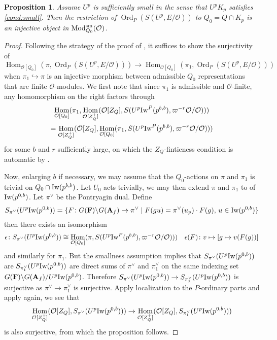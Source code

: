 \documentclass[leqno]{amsart}
\newcommand{\Iw}{\textnormal{Iw}}
\DeclareMathOperator{\Mod}{\textnormal{Mod}}
\DeclareMathOperator{\Ord}{Ord}
\newcommand{\sm}{\textnormal{sm}}
\newcommand{\A}{\mathbf A}
\newcommand{\F}{{\mathbf{F}}} %
\newcommand{\oo}{\mathcal{O}} %
\DeclareMathOperator{\Hom}{Hom}
\newtheorem{prop}[thm]{Proposition}
\theoremstyle{definition}
\theoremstyle{remark}
\begin{document}
\begin{prop}
	Assume  $U^p$ is sufficiently small in the sense
	that  $U^pK_p$ satisfies \eqref{cond:small}.
	Then the restriction of
	$\Ord_P(S(U^p,E/\oo))$ to $Q_0=Q\cap K_p$ 
	is an injective object
	in $\Mod^{\sm}_{Q_0}(\oo)$.
\end{prop}
\begin{proof}
	Following the strategy of the proof of 
	\cite[Prop 3.2.4]{pan}, 
	it suffices to show the surjectivity of
	\[
		\Hom_{\oo[Q_0]}(\pi,\Ord_P(S(U^p,E/\oo)))\to 
		\Hom_{\oo[Q_0]}(\pi_1,\Ord_P(S(U^p,E/\oo)))
	\]
	when $\pi_{1}\hookrightarrow \pi$ 
	is an injective morphism between admissible $Q_0$
	representations that are finite $\oo$-modules.
	We first note that since $\pi_1$ is admissible
	and $\oo$-finite,
	any homomorphism on the right factors 
	through 
	\begin{multline*}
		\Hom_{\oo[Q_0]}(\pi_1,
		\Hom_{\oo[Z_Q^+]}
		(\oo[Z_Q], S(U^p\Iw^P(p^{b,b}),
		\varpi^{-r}\oo/\oo)))\\=
		\Hom_{\oo[Z_Q^+]}(\oo[Z_Q],
		\Hom_{\oo[Q_0]}(\pi_1, 
		S(U^p\Iw^P(p^{b,b}),\varpi^{-r}\oo/\oo)))
	\end{multline*}
	for some $b$ and  $r$ sufficiently large,
	on which 
	the $Z_Q$-fintieness condition is automatic
	by \cite[Lem 3.1.5]{emeI}.

	Now, enlarging $b$ if necessary,
	we may assume that 
	the $Q_0$-actions on 
	$\pi$ and $\pi_1$ is trivial on
	$Q_0\cap \Iw(p^{b,b})$. 
	Let $U_0$ acts trivially,
	we may then extend $\pi$ and  $\pi_1$
	to of $\Iw(p^{0,b})$.
	Let $\pi^\vee$ be the Pontryagin dual.
	Define
	\[
		S_{\pi^\vee}(U^p\Iw(p^{0,b}))=
		\{
			F\colon G(\F)\backslash G(\A_f)\to 
			\pi^\vee\mid 
			F(gu)=\pi^\vee(u_p)\cdot F(g),\,
			u\in \Iw(p^{0,b})
		\}
	\]
	then there exists an isomorphism
	\[
		\epsilon\colon 
		S_{\pi^\vee}(U^p\Iw(p^{0,b}))\cong 
		\Hom_{\oo[Q_0]}(\pi,
		S(U^p\Iw^P(p^{b,b}),\varpi^{-r}\oo/\oo)))
		\quad \epsilon(F)\colon
		v\mapsto [g\mapsto v(F(g))]
	\]
	and similarly for $\pi_1$.
	But the smallness assumption implies
	that $S_{\pi^\vee}(U^p\Iw(p^{0,b}))$
	are $S_{\pi_1^\vee}(U^p\Iw(p^{0,b}))$
	are direct sums of 
	$\pi^\vee$ and  $\pi_1^\vee$ 
	on the same indexing set
	$G(\F)\backslash G(\A_f)/U^p\Iw(p^{0,b})$.
	Therefore 
	$S_{\pi^\vee}(U^p\Iw(p^{0,b}))\to 
	S_{\pi_1^\vee}(U^p\Iw(p^{0,b}))$ is 
	surjective
	as $\pi^\vee\to \pi_1^\vee$ is surjective.
	Apply localization to the $P$-ordinary parts
	and apply \cite[Lem 3.1.5]{emeI} again,
	we see that
	\[
		\Hom_{\oo[Z_Q^+]}(\oo[Z_Q],
		S_{\pi^\vee}(U^p\Iw(p^{0,b})))\to 
		\Hom_{\oo[Z_Q^+]}(\oo[Z_Q],
		S_{\pi^\vee_1}(U^p\Iw(p^{0,b})))
	\]
	is also surjective, from which 
	the proposition follows.
\end{proof}
\end{document}
